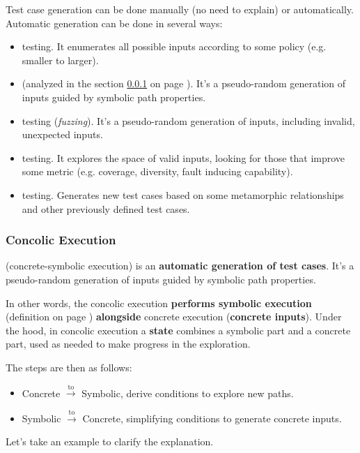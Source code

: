 Test case generation can be done manually (no need to explain) or automatically. Automatic generation can be done in several ways:
\begin{itemize}
    \item {} testing. It enumerates all possible inputs according to some policy (e.g. smaller to larger).
    
    \item {} (analyzed in the section \ref{subsubsection: Concolic Execution} on page \pageref{subsubsection: Concolic Execution}). It's a pseudo-random generation of inputs guided by symbolic path properties.
    
    \item {} testing (\emph{fuzzing}). It's a pseudo-random generation of inputs, including invalid, unexpected inputs.
    
    \item {} testing. It explores the space of valid inputs, looking for those that improve some metric (e.g. coverage, diversity, fault inducing capability).
    
    \item {} testing. Generates new test cases based on some metamorphic relationships and other previously defined test cases.
\end{itemize}

\newpage

\subsubsection{Concolic Execution}\label{subsubsection: Concolic Execution}

 (concrete-symbolic execution) is an \textbf{automatic generation of test cases}. It's a pseudo-random generation of inputs guided by symbolic path properties.

\highspace
In other words, the concolic execution \textbf{performs symbolic execution} (definition on page \pageref{def: symbolic execution}) \textbf{alongside} concrete execution (\textbf{concrete inputs}). Under the hood, in concolic execution a \textbf{state} combines a symbolic part and a concrete part, used as needed to make progress in the exploration.

\highspace
The steps are then as follows:
\begin{itemize}
    \item Concrete $\xrightarrow{\text{to}}$ Symbolic, derive conditions to explore new paths.
    
    \item Symbolic $\xrightarrow{\text{to}}$ Concrete, simplifying conditions to generate concrete inputs.
\end{itemize}
Let's take an example to clarify the explanation.

